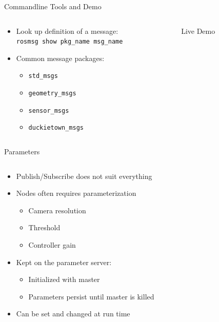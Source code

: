 \documentclass[aspectratio=43]{beamer}
\newcommand{\inline}[1]{\texttt{#1}}
\begin{document}
\begin{frame}{Commandline Tools and Demo}
	\begin{columns}
		\begin{column}{0.6\textwidth}
			\begin{itemize}
				\item Look up definition of a message:\\\inline{rosmsg show pkg_name msg_name}
				\item Common message packages:
					\begin{itemize}
						\item \inline{std_msgs}
						\item \inline{geometry_msgs}
						\item \inline{sensor_msgs}
						\item \inline{duckietown_msgs}
					\end{itemize}
			\end{itemize}
		\end{column}
		\begin{column}{0.4\textwidth}
			\centering
			Live Demo
		\end{column}
	\end{columns}
\end{frame}

\begin{frame}{Parameters}
	\begin{columns}
		\begin{column}{1.0\textwidth}
			\begin{itemize}[<+->]
				\item Publish/Subscribe does not suit everything
				\item Nodes often requires parameterization
					\begin{itemize}
						\item Camera resolution
						\item Threshold
						\item Controller gain
					\end{itemize}
				\item Kept on the parameter server:
					\begin{itemize}
						\item Initialized with master
						\item Parameters persist until master is killed
					\end{itemize}
				\item Can be set and changed at run time
			\end{itemize}
		\end{column}
	\end{columns}
\end{frame}
\end{document}

